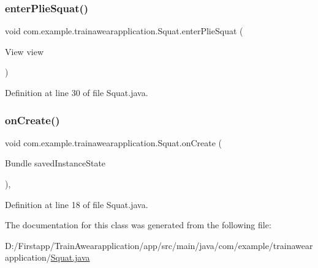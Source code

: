 \subsubsection{\texorpdfstring{enterPlieSquat()}{enterPlieSquat()}}
{\footnotesize\ttfamily void com.\+example.\+trainawearapplication.\+Squat.\+enter\+Plie\+Squat (\begin{DoxyParamCaption}\item[{View}]{view }\end{DoxyParamCaption})\hspace{0.3cm}{\ttfamily [inline]}}



Definition at line 30 of file Squat.\+java.


\begin{DoxyCode}{0}

\end{DoxyCode}
\mbox{\label{classcom_1_1example_1_1trainawearapplication_1_1_squat_a2ee401e1a295432f8196e77dcca9df5f}} 
\subsubsection{\texorpdfstring{onCreate()}{onCreate()}}
{\footnotesize\ttfamily void com.\+example.\+trainawearapplication.\+Squat.\+on\+Create (\begin{DoxyParamCaption}\item[{Bundle}]{saved\+Instance\+State }\end{DoxyParamCaption})\hspace{0.3cm}{\ttfamily [inline]}, {\ttfamily [protected]}}



Definition at line 18 of file Squat.\+java.


\begin{DoxyCode}{0}

\end{DoxyCode}


The documentation for this class was generated from the following file\+:\begin{DoxyCompactItemize}
\item 
D\+:/\+Firstapp/\+Train\+Awearapplication/app/src/main/java/com/example/trainawearapplication/\mbox{\hyperlink{_squat_8java}{Squat.\+java}}\end{DoxyCompactItemize}
